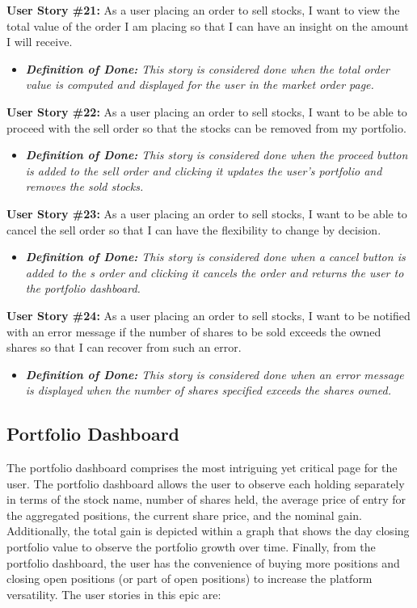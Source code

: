 \noindent \textbf{User Story \#21:} As a user placing an order to sell stocks, I want to view the total value of the order I am placing so that I can have an insight on the amount I will receive.
\begin{itemize}
	\item \textit{\textbf{Definition of Done:} This story is considered done when the total order value is computed and displayed for the user in the market order page.} 
\end{itemize}

\noindent \textbf{User Story \#22:} As a user placing an order to sell stocks, I want to be able to proceed with the sell order so that the stocks can be removed from my portfolio.
\begin{itemize}
	\item \textit{\textbf{Definition of Done:} This story is considered done when the proceed button is added to the sell order and clicking it updates the user’s portfolio and removes the sold stocks.} 
\end{itemize}

\noindent \textbf{User Story \#23:} As a user placing an order to sell stocks, I want to be able to cancel the sell order so that I can have the flexibility to change by decision.
\begin{itemize}
	\item \textit{\textbf{Definition of Done:} This story is considered done when a cancel button is added to the s order and clicking it cancels the order and returns the user to the portfolio dashboard.} 
\end{itemize}

\noindent \textbf{User Story \#24:} As a user placing an order to sell stocks, I want to be notified with an error message if the number of shares to be sold exceeds the owned shares so that I can recover from such an error.
\begin{itemize}
	\item \textit{\textbf{Definition of Done:} This story is considered done when an error message is displayed when the number of shares specified exceeds the shares owned.} 
\end{itemize}

\subsection{Portfolio Dashboard}
    \label{subsec:portfolio_dashboard}

The portfolio dashboard comprises the most intriguing yet critical page for the user. The portfolio dashboard allows the user to observe each holding separately in terms of the stock name, number of shares held, the average price of entry for the aggregated positions, the current share price, and the nominal  gain. Additionally, the total gain is depicted within a graph that shows the day closing portfolio value to observe the portfolio growth over time. Finally, from the portfolio dashboard, the user has the convenience of buying more positions and closing open positions (or part of open positions) to increase the platform versatility. The user stories in this epic are:\\

